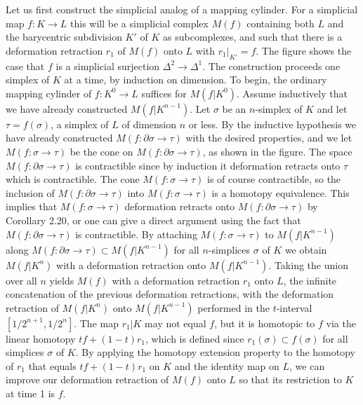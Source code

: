 Let us first construct the simplicial analog of a mapping cylinder. For a simplicial map $f : K \to L$ this will be a simplicial complex $M(f)$ containing both $L$ and the barycentric subdivision $K'$ of $K$ as subcomplexes, and such that there is a deformation retraction $r_1$ of $M(f)$ onto $L$ with $r_1|_{K'} = f$. The figure shows the case that $f$ is a simplicial surjection $\Delta^2 \to \Delta^1$. The construction proceeds one simplex of $K$ at a time, by induction on dimension. To begin, the ordinary mapping cylinder of $f : K^0 \to L$ suffices for $M(f|K^0)$. Assume inductively that we have already constructed $M(f|K^{n-1})$. Let $\sigma$ be an $n$-simplex of $K$ and let $\tau = f(\sigma)$, a simplex of $L$ of dimension $n$ or less. By the inductive hypothesis we have already constructed $M(f : \partial \sigma \to \tau)$ with the desired properties, and we let $M(f : \sigma \to \tau)$ be the cone on $M(f : \partial \sigma \to \tau)$, as shown in the figure. The space $M(f : \partial \sigma \to \tau)$ is contractible since by induction it deformation retracts onto $\tau$ which is contractible. The cone $M(f : \sigma \to \tau)$ is of course contractible, so the inclusion of $M(f : \partial \sigma \to \tau)$ into $M(f : \sigma \to \tau)$ is a homotopy equivalence. This implies that $M(f : \sigma \to \tau)$ deformation retracts onto $M(f : \partial \sigma \to \tau)$ by Corollary 2.20, or one can give a direct argument using the fact that $M(f : \partial \sigma \to \tau)$ is contractible. By attaching $M(f : \sigma \to \tau)$ to $M(f|K^{n-1})$ along $M(f : \partial \sigma \to \tau) \subset M(f|K^{n-1})$ for all $n$-simplices $\sigma$ of $K$ we obtain $M(f|K^n)$ with a deformation retraction onto $M(f|K^{n-1})$. Taking the union over all $n$ yields $M(f)$ with a deformation retraction $r_1$ onto $L$, the infinite concatenation of the previous deformation retractions, with the deformation retraction of $M(f|K^n)$ onto $M(f|K^{n-1})$ performed in the $t$-interval $[1/2^{n+1}, 1/2^n]$. The map $r_1|K$ may not equal $f$, but it is homotopic to $f$ via the linear homotopy $tf + (1-t)r_1$, which is defined since $r_1(\sigma) \subset f(\sigma)$ for all simplices $\sigma$ of $K$. By applying the homotopy extension property to the homotopy of $r_1$ that equals $tf + (1-t)r_1$ on $K$ and the identity map on $L$, we can improve our deformation retraction of $M(f)$ onto $L$ so that its restriction to $K$ at time 1 is $f$.



